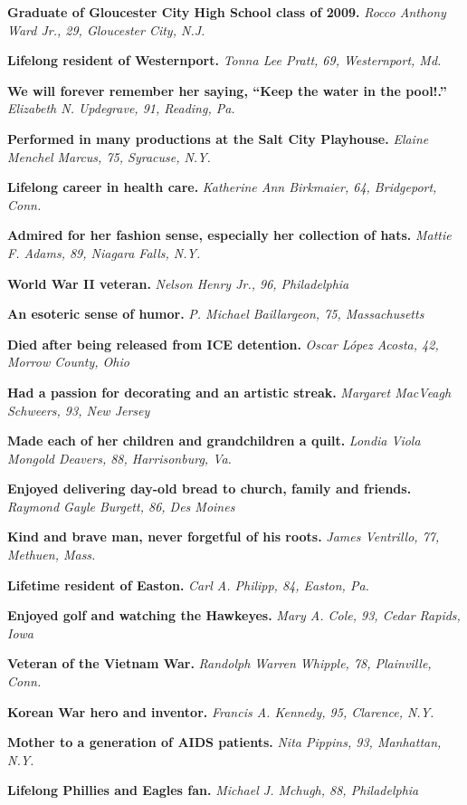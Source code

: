 \textbf{Graduate of Gloucester City High School class of 2009.}
\emph{Rocco Anthony Ward Jr., 29, Gloucester City, N.J.}

\textbf{Lifelong resident of Westernport.} \emph{Tonna Lee Pratt, 69,
Westernport, Md.}

\textbf{We will forever remember her saying, ``Keep the water in the
pool!.''} \emph{Elizabeth N. Updegrave, 91, Reading, Pa.}

\textbf{Performed in many productions at the Salt City Playhouse.}
\emph{Elaine Menchel Marcus, 75, Syracuse, N.Y.}

\textbf{Lifelong career in health care.} \emph{Katherine Ann Birkmaier,
64, Bridgeport, Conn.}

\textbf{Admired for her fashion sense, especially her collection of
hats.} \emph{Mattie F. Adams, 89, Niagara Falls, N.Y.}

\textbf{World War II veteran.} \emph{Nelson Henry Jr., 96, Philadelphia}

\textbf{An esoteric sense of humor.} \emph{P. Michael Baillargeon, 75,
Massachusetts}

\textbf{Died after being released from ICE detention.} \emph{Oscar López
Acosta, 42, Morrow County, Ohio}

\textbf{Had a passion for decorating and an artistic streak.}
\emph{Margaret MacVeagh Schweers, 93, New Jersey}

\textbf{Made each of her children and grandchildren a quilt.}
\emph{Londia Viola Mongold Deavers, 88, Harrisonburg, Va.}

\textbf{Enjoyed delivering day-old bread to church, family and friends.}
\emph{Raymond Gayle Burgett, 86, Des Moines}

\textbf{Kind and brave man, never forgetful of his roots.} \emph{James
Ventrillo, 77, Methuen, Mass.}

\textbf{Lifetime resident of Easton.} \emph{Carl A. Philipp, 84, Easton,
Pa.}

\textbf{Enjoyed golf and watching the Hawkeyes.} \emph{Mary A. Cole, 93,
Cedar Rapids, Iowa}

\textbf{Veteran of the Vietnam War.} \emph{Randolph Warren Whipple, 78,
Plainville, Conn.}

\textbf{Korean War hero and inventor.} \emph{Francis A. Kennedy, 95,
Clarence, N.Y.}

\textbf{Mother to a generation of AIDS patients.} \emph{Nita Pippins,
93, Manhattan, N.Y.}

\textbf{Lifelong Phillies and Eagles fan.} \emph{Michael J. Mchugh, 88,
Philadelphia}


